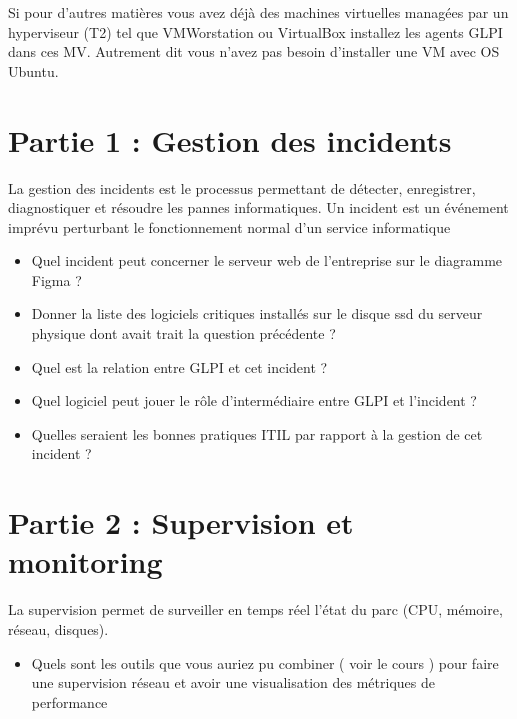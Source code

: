 \documentclass[12pt, letterpaper]{article}
\begin{document}
\begin{tcolorbox}[colback=orange!5,colframe=orange!60!black,title=Attention]
Si pour d'autres matières vous avez déjà des machines virtuelles managées par un hyperviseur (T2) tel que VMWorstation ou VirtualBox 
installez les agents GLPI dans ces MV. Autrement dit vous n'avez pas besoin d'installer une VM avec OS Ubuntu.
\end{tcolorbox}

\section*{Partie 1 : Gestion des incidents}


\begin{tcolorbox}[colback=brown!5,colframe=brown!60!black,title=Définition]
    La gestion des incidents est le processus permettant de détecter, enregistrer, diagnostiquer et
résoudre les pannes informatiques.
Un incident est un événement imprévu perturbant le fonctionnement normal d’un service
informatique 
\end{tcolorbox}

\begin{itemize}
    \item Quel incident peut concerner le serveur web de l'entreprise sur le diagramme Figma ?
    \item Donner la liste des logiciels critiques installés sur le disque ssd du serveur physique dont avait trait la question précédente ?
    \item Quel est la relation entre GLPI et cet incident ?
    \item Quel logiciel peut jouer le rôle d'intermédiaire entre GLPI et l'incident ?
    \item Quelles seraient les bonnes pratiques ITIL par rapport à la gestion de cet incident ?
\end{itemize}


\section*{Partie 2 : Supervision et monitoring}


\begin{tcolorbox}[colback=brown!5,colframe=brown!60!black,title=Définition]
La supervision permet de surveiller en temps réel l’état du parc (CPU, mémoire, réseau,
disques).
\end{tcolorbox}



\begin{itemize}
    \item Quels sont les outils que vous auriez pu combiner ( voir le cours ) pour faire une supervision réseau et avoir une visualisation des métriques de performance
\end{itemize}
\end{document}

